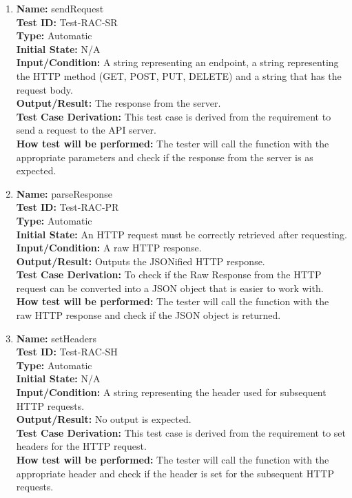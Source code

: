 \documentclass[12pt, titlepage]{article}
\begin{document}
\begin{enumerate}

  \item \textbf{Name:} sendRequest \label{itm:Test-RAC-SR} \\
        \textbf{Test ID:} Test-RAC-SR \\
        \textbf{Type:} Automatic \\
        \textbf{Initial State:} N/A \\
        \textbf{Input/Condition:} A string representing an endpoint, a string representing the HTTP method (GET, POST, PUT, DELETE) and a string that has the request body.  \\
        \textbf{Output/Result:} The response from the server. \\
        \textbf{Test Case Derivation:} This test case is derived from the requirement to send a request to the API server. \\
        \textbf{How test will be performed:} The tester will call the function with the appropriate parameters and check if the response from the server is as expected. \\

  \item \textbf{Name:} parseResponse \label{itm:Test-RAC-PR} \\
        \textbf{Test ID:} Test-RAC-PR \\
        \textbf{Type:} Automatic \\
        \textbf{Initial State:} An HTTP request must be correctly retrieved after requesting. \\
        \textbf{Input/Condition:} A raw HTTP response. \\
        \textbf{Output/Result:} Outputs the JSONified HTTP response. \\
        \textbf{Test Case Derivation:} To check if the Raw Response from the HTTP request can be converted into a JSON object that is easier to work with. \\
        \textbf{How test will be performed:} The tester will call the function with the raw HTTP response and check if the JSON object is returned. \\

  \item \textbf{Name:} setHeaders \label{itm:Test-RAC-SH} \\
        \textbf{Test ID:} Test-RAC-SH \\
        \textbf{Type:} Automatic \\
        \textbf{Initial State:} N/A \\
        \textbf{Input/Condition:} A string representing the header used for subsequent HTTP requests. \\
        \textbf{Output/Result:} No output is expected. \\
        \textbf{Test Case Derivation:} This test case is derived from the requirement to set headers for the HTTP request. \\
        \textbf{How test will be performed:} The tester will call the function with the appropriate header and check if the header is set for the subsequent HTTP requests. \\


\end{enumerate}
\end{document}
